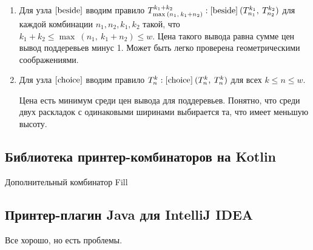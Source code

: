 \begin{enumerate}
\item Для узла $[\mbox{\lstinline{beside}}]$ вводим правило
  $T^{k_1+k_2}_{\max\:(n_1,\:k_1+n_2)}:[\mbox{\lstinline{beside}}]\:(T^{k_1}_{n_1},\:T^{k_2}_{n_2})$
  для каждой комбинации $n_1, n_2, k_1, k_2$ такой, что $k_1+k_2\le\max\:(n_1,\:k_1+n_2)\le w$.
  Цена такого вывода равна сумме цен вывод поддеревьев минус 1.
  Может быть легко проверена геометрическими соображениями.

\item Для узла $[\mbox{\lstinline{choice}}]$ вводим правило
  $T^k_n:[\mbox{\lstinline{choice}}]\:(T^k_n,\:T^k_n)$ для всех $k\le n\le w$.

  Цена есть минимум среди цен вывода для поддеревьев. Понятно, что среди двух раскладок
  с одинаковыми ширинами выбирается та, что имеет меньшую высоту.
\end{enumerate}


\subsection{Библиотека принтер-комбинаторов на Kotlin}
Дополнительный комбинатор Fill

\subsection{Принтер-плагин Java для IntelliJ IDEA}

Все хорошо, но есть проблемы.

